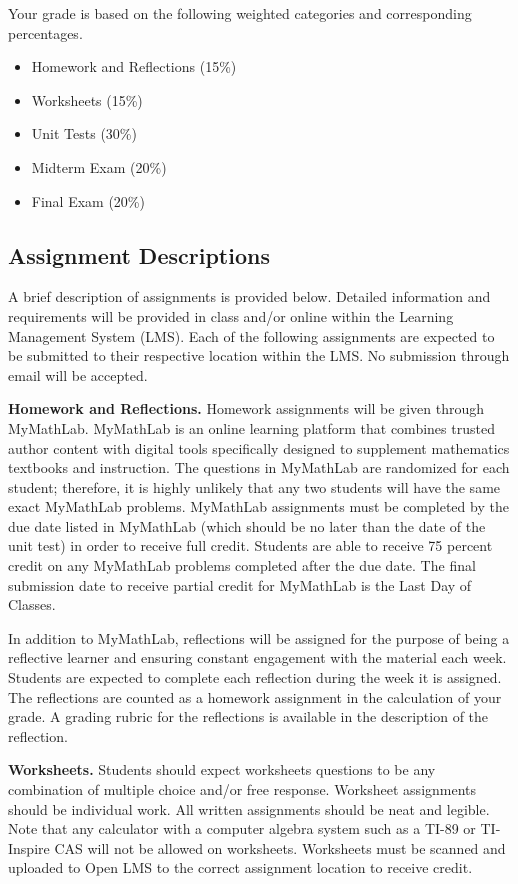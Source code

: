 \documentclass{article}
\begin{document}
Your grade is based on the following weighted categories and corresponding percentages.

\begin{itemize}
\item Homework and Reflections (15\%)
\item Worksheets (15\%)
\item Unit Tests (30\%)
\item Midterm Exam (20\%)
\item Final Exam (20\%)
\end{itemize}

\subsection{Assignment Descriptions}

A brief description of assignments is provided below. Detailed information and requirements will be provided in class and/or online within the Learning Management System (LMS). Each of the following assignments are expected to be submitted to their respective location within the LMS. No submission through email will be accepted.

\textbf{Homework and Reflections.} Homework assignments will be given through MyMathLab. MyMathLab is an online learning platform that combines trusted author content with digital tools specifically designed to supplement mathematics textbooks and instruction. The questions in MyMathLab are randomized for each student; therefore, it is highly unlikely that any two students will have the same exact MyMathLab problems. MyMathLab assignments must be completed by the due date listed in MyMathLab (which should be no later than the date of the unit test) in order to receive full credit. Students are able to receive 75 percent credit on any MyMathLab problems completed after the due date. The final submission date to receive partial credit for MyMathLab is the Last Day of Classes.

In addition to MyMathLab, reflections will be assigned for the purpose of being a reflective learner and ensuring constant engagement with the material each week. Students are expected to complete each reflection during the week it is assigned. The reflections are counted as a homework assignment in the calculation of your grade. A grading rubric for the reflections is available in the description of the reflection.

\textbf{Worksheets.} Students should expect worksheets questions to be any combination of multiple choice and/or free response. Worksheet assignments should be individual work. All written assignments should be neat and legible. Note that any calculator with a computer algebra system such as a TI-89 or TI-Inspire CAS will not be allowed on worksheets. Worksheets must be scanned and uploaded to Open LMS to the correct assignment location to receive credit.
\end{document}
